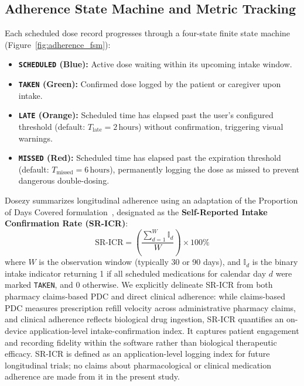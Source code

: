 \documentclass[11pt,a4paper]{article}
\begin{document}
\subsection{Adherence State Machine and Metric Tracking}

Each scheduled dose record progresses through a four-state finite state machine (Figure~\ref{fig:adherence_fsm}):
\begin{itemize}[leftmargin=*]
    \item \textbf{\texttt{SCHEDULED} (Blue):} Active dose waiting within its upcoming intake window.
    \item \textbf{\texttt{TAKEN} (Green):} Confirmed dose logged by the patient or caregiver upon intake.
    \item \textbf{\texttt{LATE} (Orange):} Scheduled time has elapsed past the user's configured threshold (default: $T_{\text{late}} = 2\,\text{hours}$) without confirmation, triggering visual warnings.
    \item \textbf{\texttt{MISSED} (Red):} Scheduled time has elapsed past the expiration threshold (default: $T_{\text{missed}} = 6\,\text{hours}$), permanently logging the dose as missed to prevent dangerous double-dosing.
\end{itemize}

Dosezy summarizes longitudinal adherence using an adaptation of the Proportion of Days Covered formulation~\cite{nau2012proportion}, designated as the \textbf{Self-Reported Intake Confirmation Rate (SR-ICR)}:
\begin{equation}
    \text{SR-ICR} = \left(\frac{\sum_{d=1}^{W} \mathbb{I}_d}{W}\right) \times 100\%
\end{equation}
where $W$ is the observation window (typically 30 or 90 days), and $\mathbb{I}_d$ is the binary intake indicator returning 1 if all scheduled medications for calendar day $d$ were marked \texttt{TAKEN}, and 0 otherwise. We explicitly delineate SR-ICR from both pharmacy claims-based PDC and direct clinical adherence: while claims-based PDC measures prescription refill velocity across administrative pharmacy claims, and clinical adherence reflects biological drug ingestion, SR-ICR quantifies an on-device application-level intake-confirmation index. It captures patient engagement and recording fidelity within the software rather than biological therapeutic efficacy. SR-ICR is defined as an application-level logging index for future longitudinal trials; no claims about pharmacological or clinical medication adherence are made from it in the present study.
\end{document}
